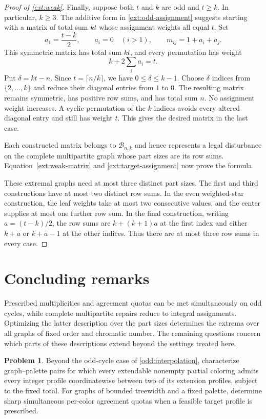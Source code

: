 \documentclass[10pt,a4paper]{amsart}
\numberwithin{equation}{section}
\theoremstyle{definition}
\newtheorem{problem}[theorem]{Problem}
\theoremstyle{remark}
\begin{document}
\begin{proof}[Proof of \cref{ext:weak}]
Finally, suppose both $t$ and $k$ are odd and $t\ge k$. In
particular, $k\ge3$. The additive form in
\cref{ext:odd-assignment} suggests starting with a matrix of total
sum $kt$ whose assignment weights all equal $t$. Set
\[
 a_1=\frac{t-k}{2},\qquad a_i=0\quad(i>1),
 \qquad m_{ij}=1+a_i+a_j.
\]
This symmetric matrix has total sum $kt$, and every permutation has
weight
\[
 k+2\sum_i a_i=t.
\]
Put $\delta=kt-n$.  Since $t=\lceil n/k\rceil$, we have
$0\le\delta\le k-1$.  Choose $\delta$ indices from
$\{2,\ldots,k\}$ and reduce their diagonal entries from $1$ to $0$.
The resulting matrix remains symmetric, has positive row sums, and
has total sum $n$.  No assignment weight increases.  A cyclic
permutation of the $k$ indices avoids every altered diagonal entry
and still has weight $t$.  This gives the desired matrix in the last
case.

Each constructed matrix belongs to $\mathcal B_{n,k}$ and hence
represents a legal disturbance on the complete multipartite graph
whose part sizes are its row sums.  Equation~\eqref{ext:weak-matrix}
and \eqref{ext:target-assignment} now prove the formula.

These extremal graphs need at most three distinct part sizes.
The first and third constructions have at most two distinct row sums.
In the even weighted-star construction, the leaf weights take at most
two consecutive values, and the center supplies at most one further
row sum. In the final construction, writing $a=(t-k)/2$, the row sums
are $k+(k+1)a$ at the first index and either $k+a$ or $k+a-1$ at the
other indices. Thus there are at most three row sums in every case.
\end{proof}

\section{Concluding remarks}\label{sec:questions}

Prescribed multiplicities and agreement quotas can be met simultaneously
on odd cycles, while complete multipartite repairs reduce to integral
assignments. Optimizing the latter description over the part sizes
determines the extrema over all graphs of fixed order and chromatic
number. The remaining questions concern which parts of these
descriptions extend beyond the settings treated here.

\begin{problem}\label{problem:profile-interpolation}
Beyond the odd-cycle case of \cref{odd:interpolation}, characterize
graph--palette pairs for which every extendable nonempty
partial coloring admits every integer profile coordinatewise between
two of its extension profiles, subject to the fixed total.
For graphs of bounded treewidth and a fixed palette, determine sharp
simultaneous per-color agreement quotas when a feasible target profile
is prescribed.
\end{problem}
\end{document}
